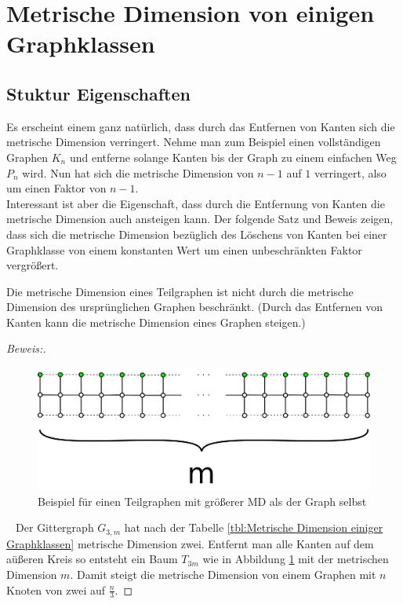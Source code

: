 \clearpage
\section{Metrische Dimension von einigen Graphklassen}
\subsection{Stuktur Eigenschaften}
Es erscheint einem ganz natürlich, dass durch das Entfernen von Kanten sich die metrische Dimension verringert. Nehme man zum Beispiel einen vollständigen Graphen $K_n$ und entferne solange Kanten bis der Graph zu einem einfachen Weg $P_n$ wird. Nun hat sich die metrische Dimension von $n-1$ auf $1$ verringert, also um einen Faktor von $n-1$.\\Interessant ist aber die Eigenschaft, dass durch die Entfernung von Kanten die metrische Dimension auch ansteigen kann. Der folgende Satz und Beweis zeigen, dass sich die metrische Dimension bezüglich des Löschens von Kanten bei einer Graphklasse von einem konstanten Wert um einen unbeschränkten Faktor vergrößert.
\begin{lem}
Die metrische Dimension eines Teilgraphen ist nicht durch die metrische Dimension des ursprünglichen Graphen beschränkt. (Durch das Entfernen von Kanten kann die metrische Dimension eines Graphen steigen.)
\end{lem}
\begin{proof}[Beweis:]$\;$
\begin{figure}[h!]
		\centering 		 
\includegraphics[width=420pt]{bilder/gitterzubaum.pdf}
   \caption{Beispiel für einen Teilgraphen mit größerer MD als der Graph selbst}
   \label{bild:Gitterbaum1}
\end{figure}
\textcolor{white}{x}\newline
Der Gittergraph $G_{3,m}$ hat nach der Tabelle \ref{tbl:Metrische Dimension einiger Graphklassen} metrische Dimension zwei. Entfernt man alle Kanten auf dem aüßeren Kreis so entsteht ein Baum $T_{3m}$ wie in Abbildung \ref{bild:Gitterbaum1} mit der metrischen Dimension $m$. Damit steigt die metrische Dimension von einem Graphen mit $n$ Knoten von zwei auf $\frac{n}{3}$.
\end{proof}
